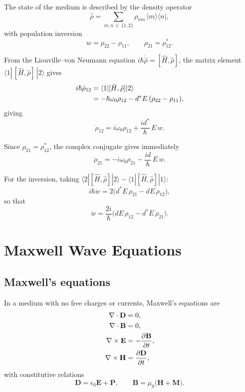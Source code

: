 \documentclass[12pt,a4paper]{article}
\begin{document}
The state of the medium is described by the density operator
\begin{equation}
  \hat{\rho} = \sum_{m,n\,\in\,\{1,2\}} \rho_{mn}\,|m\rangle\langle n|,
\end{equation}
with population inversion
\begin{equation}
  w = \rho_{22} - \rho_{11}, \qquad \rho_{21} = \rho_{12}^*.
\end{equation}

From the Liouville--von Neumann equation
$i\hbar\dot{\hat{\rho}} = [\hat{H},\hat{\rho}]$,
the matrix element $\langle 1|\,[\hat{H},\hat{\rho}]\,|2\rangle$ gives
\begin{align}
  i\hbar\dot{\rho}_{12}
  &= \langle 1|[\hat{H},\hat{\rho}]|2\rangle \notag\\
  &= -\hbar\omega_0\rho_{12} - d^*E\,(\rho_{22}-\rho_{11}),
\end{align}
giving
\begin{equation}
  \dot{\rho}_{12} = i\omega_0\rho_{12} + \frac{id^*}{\hbar}\,E\,w.
  \label{eq:rho12full}
\end{equation}

Since $\rho_{21} = \rho_{12}^*$, the complex conjugate gives immediately
\begin{equation}
  \dot{\rho}_{21} = -i\omega_0\rho_{21} - \frac{id}{\hbar}\,E\,w.
  \label{eq:rho21full}
\end{equation}

For the inversion, taking
$\langle 2|[\hat{H},\hat{\rho}]|2\rangle - \langle 1|[\hat{H},\hat{\rho}]|1\rangle$:
\begin{equation}
  i\hbar\dot{w} = 2\bigl(d^*E\,\rho_{21} - dE\,\rho_{12}\bigr),
\end{equation}
so that
\begin{equation}
  \dot{w} = \frac{2i}{\hbar}\bigl(dE\,\rho_{12} - d^*E\,\rho_{21}\bigr).
  \label{eq:wfull}
\end{equation}

\section{Maxwell Wave Equations}

\subsection{Maxwell's equations}

In a medium with no free charges or currents, Maxwell's equations are
\begin{align}
  \nabla \cdot \mathbf{D} &= 0, \\
  \nabla \cdot \mathbf{B} &= 0, \\
  \nabla \times \mathbf{E} &= -\dfrac{\partial \mathbf{B}}{\partial t}, \\
  \nabla \times \mathbf{H} &= \dfrac{\partial \mathbf{D}}{\partial t},
\end{align}
with constitutive relations
\begin{equation}
  \mathbf{D} = \epsilon_0\mathbf{E} + \mathbf{P},
  \qquad
  \mathbf{B} = \mu_0\bigl(\mathbf{H} + \mathbf{M}\bigr).
\end{equation}
\end{document}
